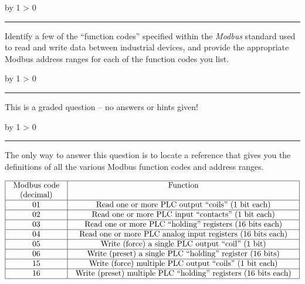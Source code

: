 \documentclass[12pt,a4paper]{article}
\def\oppgave{
            \advance\questnum by 1
            \ifnum \questnum > 0
                 \hrule
                 \vskip 3pt
                 \leftline{Oppgave \the\questnum}
                 \vskip 3pt \fi}
\def\svar{
           \advance\answnum by 1
           \ifnum \answnum > 0
                \hrule
                \vskip 3pt
                \leftline{Svar \the\answnum}
                \vskip 3pt \fi}
\def\notes{
           \advance\explnum by 1
           \ifnum \explnum > 0
                \hrule
                \vskip 3pt
                \leftline{Notes \the\explnum}
                \vskip 3pt \fi}
\begin{document}

\vfil \eject 



\oppgave{} 

Identify a few of the ``function codes'' specified within the {\it Modbus} standard used to read and write data between industrial devices, and provide the appropriate Modbus address ranges for each of the function codes you list.

\vfil
{}
\eject
\vskip 10pt \filbreak 





\svar{} 

This is a graded question -- no answers or hints given!

\vskip 10pt \filbreak 





\notes{} 

The only way to answer this question is to locate a reference that gives you the definitions of all the various Modbus function codes and address ranges.


$$\vbox{\offinterlineskip
\halign{\strut
\vrule \quad\hfil # \ \hfil & 
\vrule \quad\hfil # \ \hfil \vrule \cr
\noalign{\hrule}
%
Modbus code & Function \cr
(decimal) &  \cr
%
\noalign{\hrule}
%
01 & Read one or more PLC output ``coils'' (1 bit each) \cr
%
\noalign{\hrule}
%
02 & Read one or more PLC input ``contacts'' (1 bit each) \cr
%
\noalign{\hrule}
%
03 & Read one or more PLC ``holding'' registers (16 bits each) \cr
%
\noalign{\hrule}
%
04 & Read one or more PLC analog input registers (16 bits each) \cr
%
\noalign{\hrule}
%
05 & Write (force) a single PLC output ``coil'' (1 bit) \cr
%
\noalign{\hrule}
%
06 & Write (preset) a single PLC ``holding'' register (16 bits) \cr
%
\noalign{\hrule}
%
15 & Write (force) multiple PLC output ``coils'' (1 bit each) \cr
%
\noalign{\hrule}
%
16 & Write (preset) multiple PLC ``holding'' registers (16 bits each) \cr
%
\noalign{\hrule}
} %
}$$ %
\end{document}
